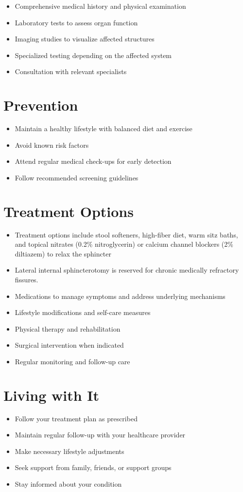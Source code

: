 \begin{itemize}[noitemsep]
  \item Comprehensive medical history and physical examination
  \item Laboratory tests to assess organ function
  \item Imaging studies to visualize affected structures
  \item Specialized testing depending on the affected system
  \item Consultation with relevant specialists
\end{itemize}
\section{Prevention}
\begin{itemize}[noitemsep]
  \item Maintain a healthy lifestyle with balanced diet and exercise
  \item Avoid known risk factors
  \item Attend regular medical check-ups for early detection
  \item Follow recommended screening guidelines
\end{itemize}
\section{Treatment Options}
\begin{itemize}[noitemsep]
  \item Treatment options include stool softeners, high-fiber diet, warm sitz baths, and topical nitrates (0.2\% nitroglycerin) or calcium channel blockers (2\% diltiazem) to relax the sphincter
  \item Lateral internal sphincterotomy is reserved for chronic medically refractory fissures.
  \item Medications to manage symptoms and address underlying mechanisms
  \item Lifestyle modifications and self-care measures
  \item Physical therapy and rehabilitation
  \item Surgical intervention when indicated
  \item Regular monitoring and follow-up care
\end{itemize}
\section{Living with It}
\begin{itemize}[noitemsep]
  \item Follow your treatment plan as prescribed
  \item Maintain regular follow-up with your healthcare provider
  \item Make necessary lifestyle adjustments
  \item Seek support from family, friends, or support groups
  \item Stay informed about your condition
\end{itemize}

